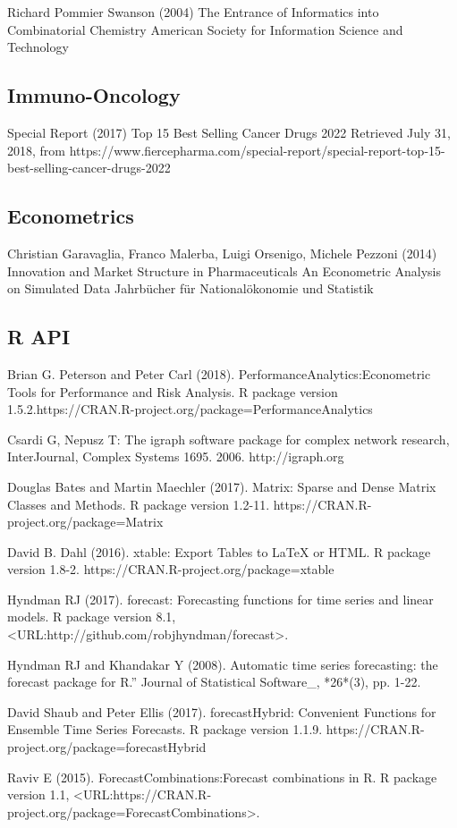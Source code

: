 Richard Pommier Swanson (2004)
\newblock The Entrance of Informatics into Combinatorial Chemistry
\newblock American Society for Information Science and Technology


\subsection{Immuno-Oncology}

Special Report (2017)
\newblock Top 15 Best Selling Cancer Drugs 2022
\newblock Retrieved July 31, 2018, from https://www.fiercepharma.com/special-report/special-report-top-15-best-selling-cancer-drugs-2022

\subsection{Econometrics}

 Christian Garavaglia, Franco Malerba, Luigi Orsenigo, Michele Pezzoni (2014)
\newblock Innovation and Market Structure in Pharmaceuticals An Econometric Analysis on Simulated Data
\newblock Jahrbücher für Nationalökonomie und Statistik 

\subsection{R API}

 Brian G. Peterson and Peter Carl (2018). 
\newblock PerformanceAnalytics:Econometric Tools for Performance and Risk Analysis. 
\newblock R package version 1.5.2.https://CRAN.R-project.org/package=PerformanceAnalytics

Csardi G, Nepusz T: 
\newblock The igraph software package for complex network research,
\newblock InterJournal, Complex Systems 1695. 2006. http://igraph.org

Douglas Bates and Martin Maechler (2017). 
\newblock Matrix: Sparse and Dense Matrix Classes and Methods. 
\newblock R package version 1.2-11. https://CRAN.R-project.org/package=Matrix

David B. Dahl (2016). 
\newblock xtable: Export Tables to LaTeX or HTML. 
\newblock R package version 1.8-2. https://CRAN.R-project.org/package=xtable

Hyndman RJ (2017). 
\newblock forecast: Forecasting functions for time series and linear models. 
\newblock R package version 8.1, <URL:http://github.com/robjhyndman/forecast>.

Hyndman RJ and Khandakar Y (2008).
\newblock Automatic time series forecasting: the forecast package for R.” 
\newblock Journal of Statistical Software_, *26*(3), pp. 1-22.

David Shaub and Peter Ellis (2017).
\newblock forecastHybrid: Convenient Functions for Ensemble Time Series Forecasts. 
\newblock R package version 1.1.9. https://CRAN.R-project.org/package=forecastHybrid

Raviv E (2015). 
\newblock ForecastCombinations:Forecast combinations in R. 
\newblock R package version 1.1, <URL:https://CRAN.R-project.org/package=ForecastCombinations>.

